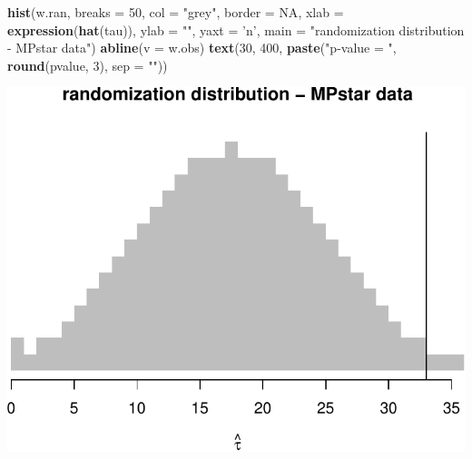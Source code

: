 \documentclass[]{article}
\newenvironment{Shaded}{\begin{snugshade}}{\end{snugshade}}
\newcommand{\KeywordTok}[1]{\textcolor[rgb]{0.13,0.29,0.53}{\textbf{#1}}}
\newcommand{\DataTypeTok}[1]{\textcolor[rgb]{0.13,0.29,0.53}{#1}}
\newcommand{\DecValTok}[1]{\textcolor[rgb]{0.00,0.00,0.81}{#1}}
\newcommand{\StringTok}[1]{\textcolor[rgb]{0.31,0.60,0.02}{#1}}
\newcommand{\OtherTok}[1]{\textcolor[rgb]{0.56,0.35,0.01}{#1}}
\newcommand{\NormalTok}[1]{#1}
\begin{document}
\begin{Shaded}
\begin{Highlighting}[]
\KeywordTok{hist}\NormalTok{(w.ran, }\DataTypeTok{breaks =} \DecValTok{50}\NormalTok{, }\DataTypeTok{col =} \StringTok{"grey"}\NormalTok{, }\DataTypeTok{border =} \OtherTok{NA}\NormalTok{,}
     \DataTypeTok{xlab =} \KeywordTok{expression}\NormalTok{(}\KeywordTok{hat}\NormalTok{(tau)), }
     \DataTypeTok{ylab =} \StringTok{""}\NormalTok{, }\DataTypeTok{yaxt =} \StringTok{'n'}\NormalTok{, }
     \DataTypeTok{main =} \StringTok{"randomization distribution - MPstar data"}\NormalTok{)}
\KeywordTok{abline}\NormalTok{(}\DataTypeTok{v =}\NormalTok{ w.obs)}
\KeywordTok{text}\NormalTok{(}\DecValTok{30}\NormalTok{, }\DecValTok{400}\NormalTok{, }
     \KeywordTok{paste}\NormalTok{(}\StringTok{"p-value = "}\NormalTok{, }\KeywordTok{round}\NormalTok{(pvalue, }\DecValTok{3}\NormalTok{), }\DataTypeTok{sep =} \StringTok{""}\NormalTok{))}
\end{Highlighting}
\end{Shaded}

\includegraphics{hw3_files/figure-latex/unnamed-chunk-3-2.pdf}
\end{document}
